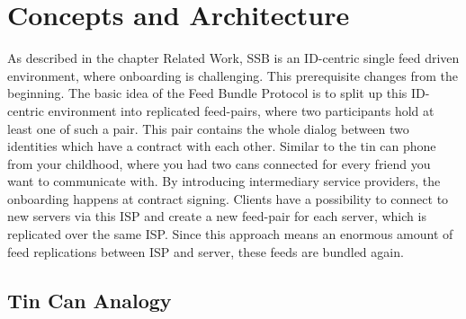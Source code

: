 \chapter{Concepts and Architecture}
As described in the chapter Related Work, SSB is an ID-centric single feed driven environment, where onboarding is challenging. 
This prerequisite changes from the beginning. The basic idea of the Feed Bundle Protocol is to split up this ID-centric environment into replicated feed-pairs, where two participants hold at least one of such a pair.  This pair contains the whole dialog between two identities which have a contract with each other. Similar to the tin can phone from your childhood, where you had two cans connected for every friend you want to communicate with. By introducing intermediary service providers, the onboarding happens at contract signing. Clients have a possibility to connect to new servers via this ISP and create a new feed-pair for each server, which is replicated over the same ISP. Since this approach means an enormous amount of feed replications between ISP and server, these feeds are bundled again.

\section{Tin Can Analogy}

